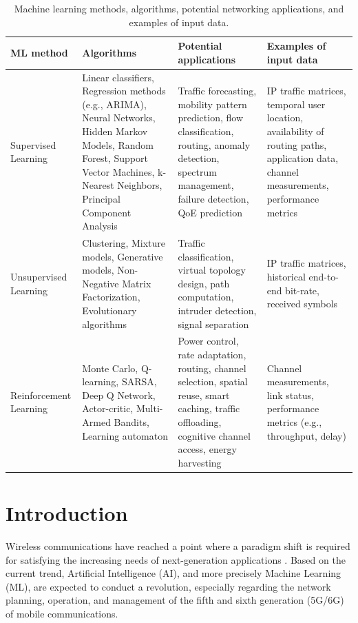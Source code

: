 \documentclass[journal]{IEEEtran}
\begin{document}
\begin{table}[t!]
	\caption{Machine learning methods, algorithms, potential networking applications, and examples of input data.}
	\label{table:ml_taxonomy}
	\centering
	\begin{tabular}{|p{}|p{}|p{}|p{}|}
		\hline
		\textbf{ML method} & \textbf{Algorithms} & \textbf{Potential applications} & \textbf{Examples of input data} \\\hline
		Supervised Learning & Linear classifiers, Regression methods (e.g., ARIMA), Neural Networks, Hidden Markov Models, Random Forest, Support Vector Machines, k-Nearest Neighbors, Principal Component Analysis &Traffic forecasting, mobility pattern prediction, flow classification, routing, anomaly detection, spectrum management, failure detection, QoE prediction & IP traffic matrices, temporal user location, availability of routing paths, application data, channel measurements, performance metrics \\\hline
		Unsupervised Learning & Clustering, Mixture models, Generative models, Non-Negative Matrix Factorization, Evolutionary algorithms & Traffic classification, virtual topology design, path computation, intruder detection, signal separation& IP traffic matrices, historical end-to-end bit-rate, received symbols \\\hline
		Reinforcement Learning & Monte Carlo, Q-learning, SARSA, Deep Q Network, Actor-critic, Multi-Armed Bandits, Learning automaton & Power control, rate adaptation, routing, channel selection, spatial reuse, smart caching, traffic offloading, cognitive channel access, energy harvesting& Channel measurements, link status, performance metrics (e.g., throughput, delay) \\\hline
	\end{tabular}
\end{table}

\section{Introduction}
% 
% 
% 
% 
Wireless communications have reached a point where a paradigm shift is required for satisfying the increasing needs of next-generation applications \cite{osseiran2014scenarios}. Based on the current trend, Artificial Intelligence (AI), and more precisely Machine Learning (ML), are expected to conduct a revolution, especially regarding the network planning, operation, and management of the fifth and sixth generation (5G/6G) of mobile communications. 
\end{document}
